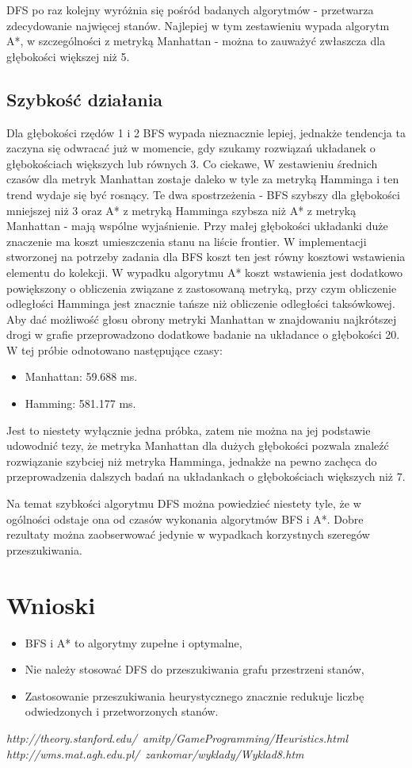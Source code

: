 \documentclass{classrep}
\begin{document}
DFS po raz kolejny wyróżnia się pośród badanych algorytmów - przetwarza zdecydowanie najwięcej stanów.
Najlepiej w tym zestawieniu wypada algorytm A*, w szczególności z metryką Manhattan - można to zauważyć
zwłaszcza dla głębokości większej niż 5.

\subsection{Szybkość działania}

Dla głębokości rzędów 1 i 2 BFS wypada nieznacznie lepiej, jednakże tendencja ta zaczyna się odwracać już w
momencie, gdy szukamy rozwiązań układanek o głębokościach większych lub równych 3. Co ciekawe, W zestawieniu
średnich czasów dla metryk Manhattan zostaje daleko w tyle za metryką Hamminga i ten trend wydaje się być
rosnący. Te dwa spostrzeżenia - BFS szybszy dla głębokości mniejszej niż 3 oraz A* z metryką Hamminga szybsza
niż A* z metryką Manhattan - mają wspólne wyjaśnienie. Przy małej głębokości układanki duże znaczenie ma koszt
umieszczenia stanu na liście frontier. W implementacji stworzonej na potrzeby zadania  dla BFS koszt
ten jest równy kosztowi wstawienia elementu do kolekcji. W wypadku algorytmu A* koszt wstawienia jest
dodatkowo powiększony o obliczenia związane z zastosowaną metryką, przy czym obliczenie odległości Hamminga
jest znacznie tańsze niż obliczenie odległości taksówkowej. Aby dać możliwość głosu obrony metryki Manhattan w
znajdowaniu najkrótszej drogi w grafie przeprowadzono dodatkowe badanie na układance o głębokości 20. W tej
próbie odnotowano następujące czasy:

\begin{itemize}
  \item Manhattan: 59.688 ms.
  \item Hamming: 581.177 ms.
\end{itemize}

Jest to niestety wyłącznie jedna próbka, zatem nie można na jej podstawie udowodnić tezy, że metryka Manhattan
dla dużych głębokości pozwala znaleźć rozwiązanie szybciej niż metryka Hamminga, jednakże na pewno zachęca do
przeprowadzenia dalszych badań na układankach o głębokościach większych niż 7.

Na temat szybkości algorytmu DFS można powiedzieć niestety tyle, że w ogólności odstaje ona od czasów
wykonania algorytmów BFS i A*. Dobre rezultaty można zaobserwować jedynie w wypadkach korzystnych szeregów
przeszukiwania.

\section{Wnioski}
\begin{itemize}
  \item BFS i A* to algorytmy zupełne i optymalne,
  \item Nie należy stosować DFS do przeszukiwania grafu przestrzeni stanów,
  \item Zastosowanie przeszukiwania heurystycznego znacznie redukuje liczbę odwiedzonych i przetworzonych
    stanów.
\end{itemize}

\begin{thebibliography}{0}
  \textsl{http://theory.stanford.edu/~amitp/GameProgramming/Heuristics.html}
  \textsl{http://wms.mat.agh.edu.pl/~zankomar/wyklady/Wyklad8.htm}
\end{thebibliography}
\end{document}
